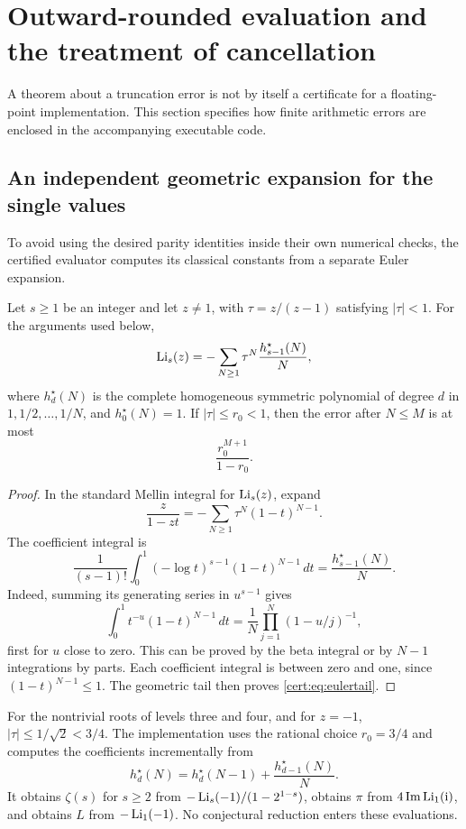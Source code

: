 \section{Outward-rounded evaluation and the treatment of cancellation}
\label{cert:sec:cert}
A theorem about a truncation error is not by itself a certificate for a
floating-point implementation. This section specifies how finite
arithmetic errors are enclosed in the accompanying executable code.

\subsection{An independent geometric expansion for the single values}
To avoid using the desired parity identities inside their own numerical
checks, the certified evaluator computes its classical constants from a
separate Euler expansion.

\begin{lemma}
\label{cert:lem:euler}
Let $s\ge1$ be an integer and let $z\ne1$, with
$\tau=z/(z-1)$ satisfying $|\tau|<1$. For the arguments used below,
\begin{equation}
 \operatorname{Li}_s(z)=-\sum_{N\ge1}\tau^N\frac{h_{s-1}^{\star}(N)}{N},
\label{cert:eq:euler}
\end{equation}
where $h_d^{\star}(N)$ is the complete homogeneous symmetric polynomial
of degree $d$ in $1,1/2,\ldots,1/N$, and $h_0^{\star}(N)=1$.
If $|\tau|\le r_0<1$, then the error after $N\le M$ is at most
\begin{equation}
 \frac{r_0^{M+1}}{1-r_0}.
\label{cert:eq:eulertail}
\end{equation}
\end{lemma}
\begin{proof}
In the standard Mellin integral for $\operatorname{Li}_s(z)$, expand
\[
 \frac{z}{1-zt}=-\sum_{N\ge1}\tau^N(1-t)^{N-1}.
\]
The coefficient integral is
\[
 \frac1{(s-1)!}\int_0^1(-\log t)^{s-1}(1-t)^{N-1}\,dt
 =\frac{h_{s-1}^{\star}(N)}{N}.
\]
Indeed, summing its generating series in $u^{s-1}$ gives
\[
 \int_0^1 t^{-u}(1-t)^{N-1}\,dt
 =\frac1N\prod_{j=1}^N(1-u/j)^{-1},
\]
first for $u$ close to zero. This can be proved by the beta integral or
by $N-1$ integrations by parts. Each coefficient integral is between
zero and one, since $(1-t)^{N-1}\le1$. The geometric tail then proves
\eqref{cert:eq:eulertail}.
\end{proof}

For the nontrivial roots of levels three and four, and for $z=-1$,
$|\tau|\le1/\sqrt2<3/4$.
The implementation uses the rational choice $r_0=3/4$ and computes the
coefficients incrementally from
\begin{equation}
 h_d^{\star}(N)=h_d^{\star}(N-1)+\frac{h_{d-1}^{\star}(N)}{N}.
\label{cert:eq:hrec}
\end{equation}
It obtains $\zeta(s)$ for $s\ge2$ from
$-\operatorname{Li}_s(-1)/(1-2^{1-s})$, obtains $\pi$ from
$4\operatorname{Im}\operatorname{Li}_1(\mathrm{i})$, and obtains $L$ from $-\operatorname{Li}_1(-1)$.
No conjectural reduction enters these evaluations.

